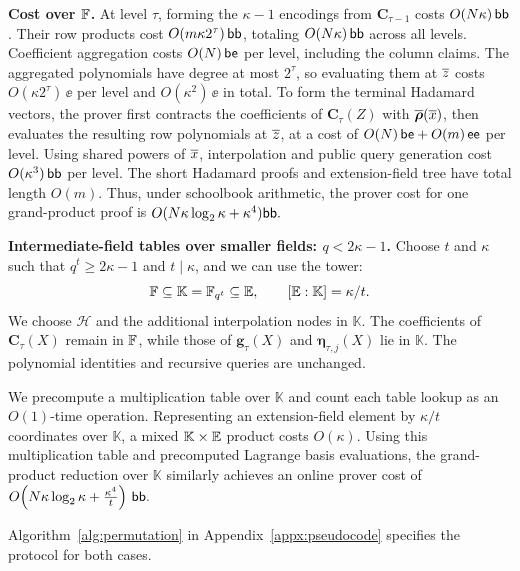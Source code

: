 \smallskip\noindent\textbf{Cost over \({\mathbb{F}}\).}
At level \(\tau\), forming the \(\kappa-1\) encodings from
\(\bm C_{\tau-1}\) costs \(O(N\kappa)\,\mathsf{bb}\).
Their row products cost \(O(m\kappa2^\tau)\,\mathsf{bb}\), totaling
\(O(N\kappa)\,\mathsf{bb}\) across all levels.
Coefficient aggregation costs \(O(N)\,\mathsf{be}\) per level,
including the column claims. The aggregated polynomials have
degree at most \(2^\tau\), so evaluating them at \(\overline{z}\)
costs \(O(\kappa2^\tau)\,\ee\) per level and
\(O(\kappa^2)\,\ee\) in total.
To form the terminal Hadamard vectors, the prover first
contracts the coefficients of \(\bm C_\tau(Z)\) with
\(\overline{\bm\rho}(\overline{x})\), then evaluates the resulting row
polynomials at \(\overline{z}\), at a cost of
\(O(N)\,\mathsf{be}+O(m)\,\mathsf{ee}\) per level.
Using shared powers of \(\overline{x}\), interpolation and public
query generation cost \(O(\kappa^3)\,\mathsf{bb}\) per level.
The short Hadamard proofs and extension-field tree have
total length \(O(m)\).
Thus, under schoolbook arithmetic, the prover cost for one
grand-product proof is
\(
    O(N\kappa\log_2\kappa+\kappa^4)\mathsf{bb}.
\)


\smallskip\noindent\textbf{Intermediate-field tables over smaller fields: \(q<2\kappa-1\).}
Choose \(t\) and $\kappa$ such that $q^t \ge 2\kappa-1$ and $t \mid \kappa$, and we can use the tower:
\[
    {\mathbb{F}}\subseteq\mathbb K=\mathbb F_{q^t}
       \subseteq\mathbb{E},
    \qquad [\mathbb{E}:\mathbb K]=\kappa/t.
\]
We choose \(\mathcal H\) and the additional interpolation nodes
in \(\mathbb K\). The coefficients of \(\bm C_\tau(X)\) remain
in \({\mathbb{F}}\), while those of \(\bm g_\tau(X)\) and
\(\bm\eta_{\tau,j}(X)\) lie in \(\mathbb K\).
The polynomial identities and recursive queries are unchanged.

We precompute a multiplication table over \(\mathbb K\)
and count each table lookup as an \(O(1)\)-time operation.
Representing an extension-field element by \(\kappa/t\)
coordinates over \(\mathbb K\), a mixed
\(\mathbb K\times\mathbb{E}\) product costs \(O(\kappa)\).
Using this multiplication table and precomputed Lagrange basis
evaluations, the grand-product reduction over \(\mathbb K\)
similarly achieves an online prover cost of
\(
    O\!\left(N\kappa\log_2\kappa+\frac{\kappa^4}{t}\right)\,\mathsf{bb}.
\)

Algorithm~\ref{alg:permutation} in Appendix~\ref{appx:pseudocode}
specifies the protocol for both cases.

